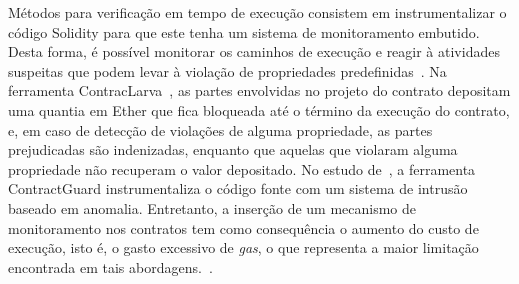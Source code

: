 Métodos para verificação em tempo de execução consistem em instrumentalizar o código Solidity para que este tenha um sistema de monitoramento embutido. Desta forma, é possível monitorar os caminhos de execução e reagir à atividades suspeitas que podem levar à violação de propriedades predefinidas~\cite{wang2019contractguard-19, azzopardi2018monitoring-61, li2020securing-77}. Na ferramenta ContracLarva~\cite{azzopardi2018monitoring-61}, as partes envolvidas no projeto do contrato depositam uma quantia em Ether que fica bloqueada até o término da execução do contrato, e, em caso de detecção de violações de alguma propriedade, as partes prejudicadas são indenizadas, enquanto que aquelas que violaram alguma propriedade não recuperam o valor depositado. No estudo de~, a ferramenta ContractGuard instrumentaliza o código fonte com um sistema de intrusão baseado em anomalia. Entretanto, a inserção de um mecanismo de monitoramento nos contratos tem como consequência o aumento do custo de execução, isto é, o gasto excessivo de \textit{gas}, o que representa a maior limitação encontrada em tais abordagens.~\cite{wang2019contractguard-19, azzopardi2018monitoring-61}.



